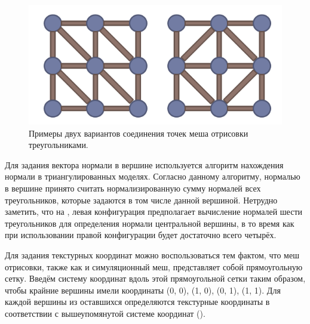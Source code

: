 	\begin{figure}[ht!] 
		\center
		\includegraphics [scale=1] {my_folder/images//meshConnect}
		\caption{Примеры двух вариантов соединения точек меша отрисовки треугольниками.}
		\label{fig:meshConnect}  
	\end{figure}
	
	Для задания вектора нормали в вершине используется алгоритм нахождения нормали в триангулированных моделях. Согласно данному алгоритму, нормалью в вершине принято считать нормализированную сумму нормалей всех треугольников, которые задаются в том числе данной вершиной. Нетрудно заметить, что на , левая конфигурация предполагает вычисление нормалей шести треугольников для определения нормали центральной вершины, в то время как при использовании правой конфигурации будет достаточно всего четырёх.
	
	Для задания текстурных координат можно воспользоваться тем фактом, что меш отрисовки, также как и симуляционный меш, представляет собой прямоугольную сетку. Введём систему координат вдоль этой прямоугольной сетки таким образом, чтобы крайние вершины имели координаты (0, 0), (1, 0), (0, 1), (1, 1). Для каждой вершины из оставшихся определяются текстурные координаты в соответствии с вышеупомянутой системе координат ().
	
